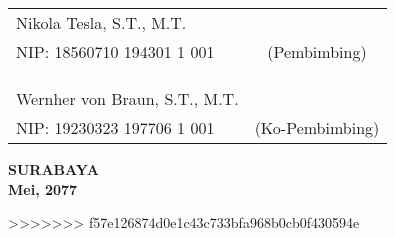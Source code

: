 \noindent
\begin{tabularx}{\textwidth}{X c}
  Nikola Tesla, S.T., M.T.      &                 \\
  NIP: 18560710 194301 1 001    & (Pembimbing)    \\
                                &                 \\
                                &                 \\
                                &                 \\
  Wernher von Braun, S.T., M.T. &                 \\
  NIP: 19230323 197706 1 001    & (Ko-Pembimbing) \\
\end{tabularx}
\endgroup

\vspace{\fill}

\begin{center}
  \textbf{SURABAYA} \\
  \textbf{Mei, 2077}
\end{center}
>>>>>>> f57e126874d0e1c43c733bfa968b0cb0f430594e
\endgroup
